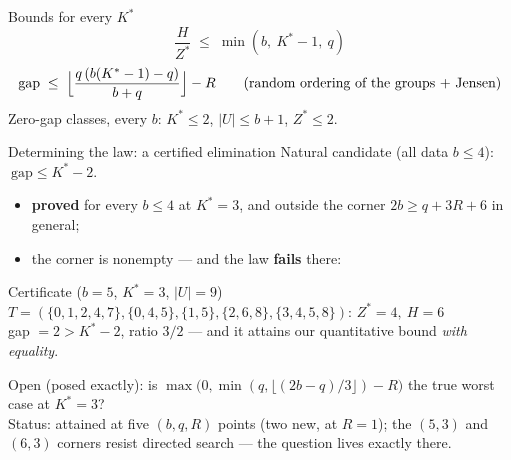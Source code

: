 \documentclass[10pt]{beamer}
\newcommand{\U}{U}\newcommand{\Kst}{K^{\ast}}\newcommand{\Zst}{Z^{\ast}}
\begin{document}
\begin{frame}{Bounds for every $\Kst$}
\[
  \frac{H}{\Zst}\;\le\;\min(b,\ \Kst-1,\ q)
\]
\pause
\[
  \mathrm{gap}\;\le\;\Bigl\lfloor\frac{q\,(b(\Kst-1)-q)}{b+q}\Bigr\rfloor - R
  \qquad\text{(random ordering of the groups + Jensen)}
\]
\pause
Zero-gap classes, every $b$: \quad $\Kst\le2$, \quad $|\U|\le b+1$,
\quad $\Zst\le2$.
\end{frame}

\begin{frame}{Determining the law: a certified elimination}
Natural candidate (all data $b\le4$): $\ \mathrm{gap}\le\Kst-2$.
\begin{itemize}
  \item \textbf{proved} for every $b\le4$ at $\Kst=3$, and outside the corner
        $2b\ge q+3R+6$ in general;
  \item the corner is nonempty --- and the law \textbf{fails} there:
\end{itemize}
\pause
\begin{alertblock}{Certificate ($b=5$, $\Kst=3$, $|\U|=9$)}
$T=(\{0,1,2,4,7\},\{0,4,5\},\{1,5\},\{2,6,8\},\{3,4,5,8\})$:\quad
$\Zst=4,\ H=6$ \\
gap $=2>\Kst-2$, ratio $3/2$ --- and it attains our quantitative bound
\emph{with equality}.
\end{alertblock}
\pause
Open (posed exactly): is
$\max\bigl(0,\min(q,\lfloor(2b-q)/3\rfloor)-R\bigr)$ the true worst case at
$\Kst=3$?\\[1mm]
{\footnotesize Status: attained at five $(b,q,R)$ points (two new, at $R=1$);
the $(5,3)$ and $(6,3)$ corners resist directed search --- the question lives
exactly there.}
\end{frame}
\end{document}
